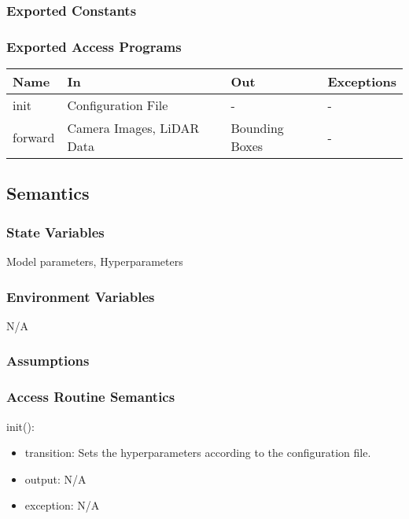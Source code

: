 \documentclass[12pt, titlepage]{article}
\begin{document}
\subsubsection{Exported Constants}



\subsubsection{Exported Access Programs}

\begin{center}
\begin{tabular}{p{2cm} p{4cm} p{4cm} p{2cm}}
\hline
\textbf{Name} & \textbf{In} & \textbf{Out} & \textbf{Exceptions} \\
\hline
init & Configuration File & - & - \\
\hline
forward & Camera Images, LiDAR Data & Bounding Boxes & - \\
\hline
\end{tabular}
\end{center}

\subsection{Semantics}

\subsubsection{State Variables}

Model parameters,
Hyperparameters

\subsubsection{Environment Variables}

N/A

\subsubsection{Assumptions}



\subsubsection{Access Routine Semantics}


\noindent init():
\begin{itemize}
\item transition: Sets the hyperparameters according to the configuration file.
\item output: N/A
\item exception: N/A
\end{itemize}
\end{document}

